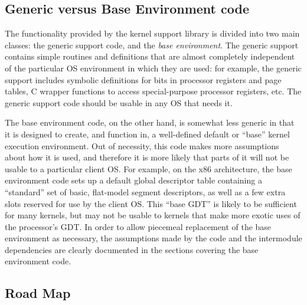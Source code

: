 \subsection{Generic versus Base Environment code}

The functionality provided by the kernel support library
is divided into two main classes:
the generic support code, and the \emph{base environment}.
The generic support contains simple routines and definitions
that are almost completely independent
of the particular OS environment in which they are used:
for example, the generic support includes
symbolic definitions for bits in processor registers and page tables,
C wrapper functions to access special-purpose processor registers, etc.
The generic support code should be usable in any OS that needs it.

The base environment code, on the other hand,
is somewhat less generic
in that it is designed to create, and function in,
a well-defined default or ``base'' kernel execution environment.
Out of necessity, this code makes more assumptions about how it is used,
and therefore it is more likely that parts of it
will not be usable to a particular client OS\@.
For example, on the x86 architecture,
the base environment code sets up a default global descriptor table
containing a ``standard'' set of basic, flat-model segment descriptors,
as well as a few extra slots reserved for use by the client OS\@.
This ``base GDT'' is likely to be sufficient for many kernels,
but may not be usable to kernels
that make more exotic uses of the processor's GDT\@.
In order to allow piecemeal replacement of the base environment as necessary,
the assumptions made by the code and the intermodule dependencies
are clearly documented in the sections covering the base environment code.

\subsection{Road Map}


